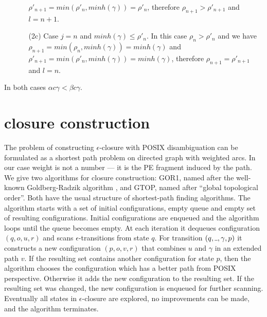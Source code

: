 \documentclass[AMA,STIX1COL]{WileyNJD-v2}
\newcommand{\Xund}{\rule{.4em}{.4pt}}
\begin{document}
\begin{proofEnd}
\begin{itemize}[itemsep=0.5em, topsep=0.5em]
\begin{itemize}
            $\rho'_{n+1} = min(\rho'_n, minh(\gamma)) = \rho'_n$,
            therefore $\rho_{n+1} > \rho'_{n+1}$
            and $l = n + 1$.
        \item[(2c)]
            Case $j = n$ and $minh(\gamma) \leq \rho'_n$.
            In this case $\rho_n > \rho'_n$ and we have
            $\rho_{n+1} = min(\rho_n, minh(\gamma)) = minh(\gamma)$ and
            $\rho'_{n+1} = min(\rho'_n, minh(\gamma)) = minh(\gamma)$,
            therefore $\rho_{n+1} = \rho'_{n+1}$
            and $l = n$.
        \end{itemize}
    \end{itemize}
    In both cases $\alpha c \gamma < \beta c \gamma$.
\end{proofEnd}


\section{closure construction}\label{section_closure}

The problem of constructing $\epsilon$-closure with POSIX disambiguation
can be formulated as a shortest path problem on directed graph with weighted arcs.
In our case weight is not a number --- it is the PE fragment induced by the path.
%
We give two algorithms for closure construction: GOR1, named after the well-known Goldberg-Radzik algorithm \cite{GR93},
and GTOP, named after ``global topological order''.
%
Both have the usual structure of shortest-path finding algorithms.
The algorithm starts with a set of initial configurations, empty queue and empty set of resulting configurations.
Initial configurations are enqueued and the algorithm loops until the queue becomes empty.
At each iteration it dequeues configuration $(q, o, u, r)$ and scans $\epsilon$-transitions from state $q$.
For transition $(q, \Xund, \gamma, p)$ it constructs a new configuration $(p, o, v, r)$
that combines $u$ and $\gamma$ in an extended path $v$.
If the resulting set contains another configuration for state $p$,
then the algorithm chooses the configuration which has a better path from POSIX perspective.
Otherwise it adds the new configuration to the resulting set.
If the resulting set was changed, the new configuration is enqueued for further scanning.
Eventually all states in $\epsilon$-closure are explored, no improvements can be made, and the algorithm terminates.
%
\\
\end{document}
